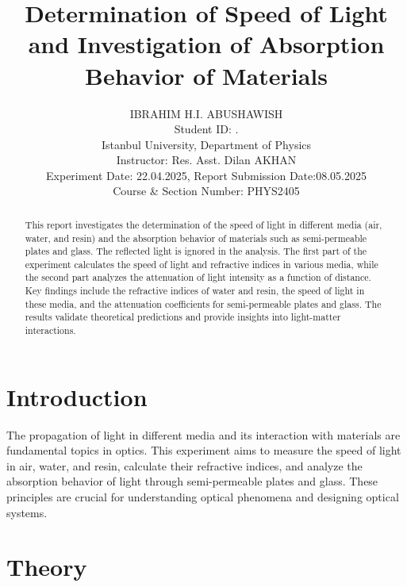 \documentclass[journal]{IEEEtran}
\begin{document}
\title{Determination of Speed of Light and Investigation of Absorption Behavior of Materials}
\author{IBRAHIM H.I. ABUSHAWISH \\

{\small Student ID: \hspace{1.5cm}. \\ 
Istanbul University, Department of Physics \\
Instructor: Res. Asst. Dilan AKHAN \\
Experiment Date: 22.04.2025, Report Submission Date:08.05.2025 \\
Course \& Section Number: PHYS2405}}


\maketitle

\begin{abstract}
    This report investigates the determination of the speed of light in different media (air, water, and resin) and the absorption behavior of materials such as semi-permeable plates and glass. The reflected light is ignored in the analysis. The first part of the experiment calculates the speed of light and refractive indices in various media, while the second part analyzes the attenuation of light intensity as a function of distance. Key findings include the refractive indices of water and resin, the speed of light in these media, and the attenuation coefficients for semi-permeable plates and glass. The results validate theoretical predictions and provide insights into light-matter interactions.
\end{abstract}

\section{Introduction}
The propagation of light in different media and its interaction with materials are fundamental topics in optics. This experiment aims to measure the speed of light in air, water, and resin, calculate their refractive indices, and analyze the absorption behavior of light through semi-permeable plates and glass. These principles are crucial for understanding optical phenomena and designing optical systems.

\section{Theory}
\end{document}
